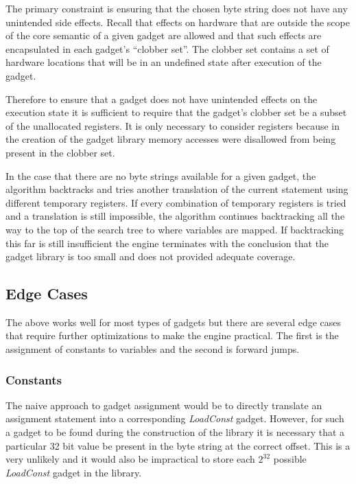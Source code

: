     The primary constraint is ensuring that the chosen byte string does not have
    any unintended side effects. Recall that effects on hardware that are
    outside the scope of the core semantic of a given gadget are allowed and
    that such effects are encapsulated in each gadget's ``clobber set''. The
    clobber set contains a set of hardware locations that will be in an
    undefined state after execution of the gadget.

    Therefore to ensure that a gadget does not have unintended effects on the
    execution state it is sufficient to require that the gadget's clobber set be
    a subset of the unallocated registers. It is only necessary to consider
    registers because in the creation of the gadget library memory accesses were
    disallowed from being present in the clobber set.

    In the case that there are no byte strings available for a given gadget, the
    algorithm backtracks and tries another translation of the current statement
    using different temporary registers. If every combination of temporary
    registers is tried and a translation is still impossible, the algorithm
    continues backtracking all the way to the top of the search tree to where
    variables are mapped. If backtracking this far is still insufficient the
    engine terminates with the conclusion that the gadget library is too small
    and does not provided adequate coverage. 

    \subsection{Edge Cases}

    The above works well for most types of gadgets but there are several edge
    cases that require further optimizations to make the engine practical. The
    first is the assignment of constants to variables and the second is forward
    jumps.

    \subsubsection{Constants}

    The naive approach to gadget assignment would be to directly translate an
    assignment statement into a corresponding \emph{LoadConst} gadget. However,
    for such a gadget to be found during the construction of the library it is
    necessary that a particular 32 bit value be present in the byte string at
    the correct offset. This is a very unlikely and it would also be impractical
    to store each $2^{32}$ possible \emph{LoadConst} gadget in the library. 

